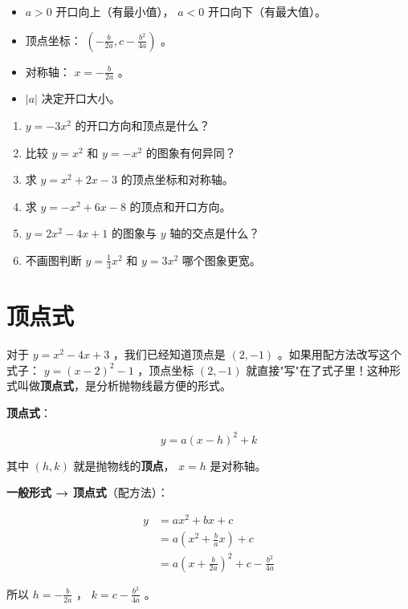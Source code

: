 \begin{keytakeaway}


\begin{itemize}
  \item $a > 0$ 开口向上（有最小值）， $a < 0$ 开口向下（有最大值）。
  \item 顶点坐标： $\left(-\frac{b}{2a}, c - \frac{b^2}{4a}\right)$ 。
  \item 对称轴： $x = -\frac{b}{2a}$ 。
  \item $\lvert a \rvert$ 决定开口大小。
\end{itemize}


\end{keytakeaway}

\begin{practice}


\begin{enumerate}
  \item $y = -3x^2$ 的开口方向和顶点是什么？
  \item 比较 $y = x^2$ 和 $y = -x^2$ 的图象有何异同？
  \item 求 $y = x^2 + 2x - 3$ 的顶点坐标和对称轴。
  \item 求 $y = -x^2 + 6x - 8$ 的顶点和开口方向。
  \item $y = 2x^2 - 4x + 1$ 的图象与 $y$ 轴的交点是什么？
  \item 不画图判断 $y = \frac{1}{3}x^2$ 和 $y = 3x^2$ 哪个图象更宽。
\end{enumerate}


\end{practice}

\section*{顶点式}


\begin{explore}


对于 $y = x^2 - 4x + 3$ ，我们已经知道顶点是 $(2, -1)$ 。如果用配方法改写这个式子： $y = (x - 2)^2 - 1$ ，顶点坐标 $(2, -1)$ 就直接"写"在了式子里！这种形式叫做\textbf{顶点式}，是分析抛物线最方便的形式。

\end{explore}

\begin{understand}


\textbf{顶点式}：

\[
y = a(x - h)^2 + k
\]


其中 $(h, k)$ 就是抛物线的\textbf{顶点}， $x = h$ 是对称轴。

\textbf{一般形式 → 顶点式}（配方法）：

\[
\begin{aligned}
y &= ax^2 + bx + c \\
&= a\left(x^2 + \frac{b}{a}x\right) + c \\
&= a\left(x + \frac{b}{2a}\right)^2 + c - \frac{b^2}{4a}
\end{aligned}
\]


所以 $h = -\frac{b}{2a}$ ， $k = c - \frac{b^2}{4a}$ 。

\end{understand}


